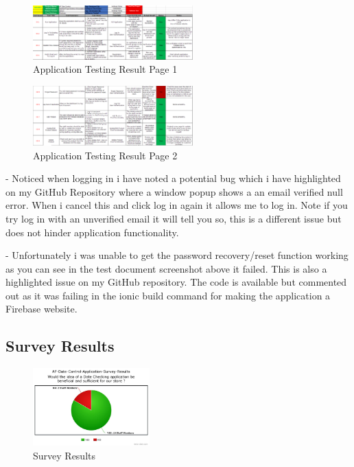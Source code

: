 \begin{figure}[h!]
	\caption{Application Testing Result Page 1}
	\label{image:test1}
	\centering
	\includegraphics[width=0.55\textwidth]{images/testResults1.PNG}
\end{figure}
\begin{figure}[h!]
	\caption{Application Testing Result Page 2}
	\label{image:test2}
	\centering
	\includegraphics[width=0.55\textwidth]{images/testResults2.PNG}
\end{figure}
\newpage
- Noticed when logging in i have noted a potential bug which i have highlighted on my GitHub Repository where a window popup shows a an email verified null error. When i cancel this and click log in again it allows me to log in. Note if you try log in with an unverified email it will tell you so, this is a different issue but does not hinder application functionality. 
\newline

- Unfortunately i was unable to get the password recovery/reset function working as you can see in the test document screenshot above it failed. This is also a highlighted issue on my GitHub repository. The code is available but commented out as it was failing in the ionic build command for making the application a Firebase website.

\subsection{Survey Results}

\begin{figure}[h!]
	\caption{Survey Results}
	\label{image:surveyResults}
	\centering
	\includegraphics[width=0.4\textwidth]{images/AF-Date-Control-Survey-Results.jpeg}
\end{figure}

